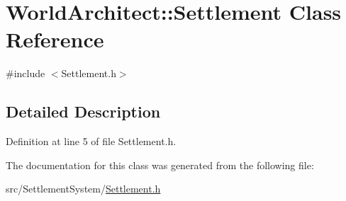 \hypertarget{class_world_architect_1_1_settlement}{}\section{World\+Architect\+::Settlement Class Reference}
\label{class_world_architect_1_1_settlement}


{\ttfamily \#include $<$Settlement.\+h$>$}



\subsection{Detailed Description}


Definition at line 5 of file Settlement.\+h.



The documentation for this class was generated from the following file\+:\begin{DoxyCompactItemize}
\item 
src/\+Settlement\+System/\mbox{\hyperlink{_settlement_8h}{Settlement.\+h}}\end{DoxyCompactItemize}
